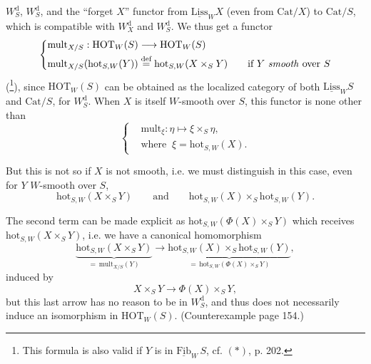 \documentclass[11pt]{article}
\newcommand{\printedpage}[1]{\marginpar{\footnotesize p.~#1}}
\newcommand{\msp}[1]{\marginpar{\footnotesize [#1]}}
\begin{document}
\setcounter{footnote}{97}

\printedpage{124}

$W_S^{\mathrm{d}}$, $W_S^{\mathrm{d}}$, and the ``forget $X$'' functor from $\underline{\mathrm{Liss}}_W X$ (even from $\mathrm{Cat}/X$) to $\mathrm{Cat}/S$, which is compatible with $W_X^{\mathrm{d}}$ and $W_S^{\mathrm{d}}$. We thus get a functor %
\[
\left\{\begin{aligned}
&\mathrm{mult}_{X/S} : \mathrm{HOT}_W(S) \longrightarrow \mathrm{HOT}_W(S)\\
&\mathrm{mult}_{X/S}(\mathrm{hot}_{S,W}(Y)) \overset{\text{def}}{=} \mathrm{hot}_{S,W}(X\times_S Y) \qquad \text{if $Y$ \textit{smooth} over $S$}
\end{aligned}\right.
\]
(\footnote{This formula is also valid if $Y$ is in $\underline{\mathrm{Fib}}_W\, S$, cf. $(*)$, p. 202.}), since $\mathrm{HOT}_W(S)$ can be obtained as the localized category of both $\underline{\mathrm{Liss}}_W S$ and $\mathrm{Cat}/S$, for $W_S^{\mathrm{d}}$. When $X$ is itself $W$-smooth over $S$, this functor is none other than
\[
\left\{\begin{aligned}
&\mathrm{mult}_\xi : \eta \longmapsto \xi\times_S \eta,\\
&\text{where }\ \xi = \mathrm{hot}_{S,W}(X).
\end{aligned}\right.
\]

But this is not so if $X$ is not smooth, i.e. we must distinguish in this case, even for $Y$ $W$-smooth over $S$,
\[
\mathrm{hot}_{S,W}(X\times_S Y) \qquad\text{and}\qquad \mathrm{hot}_{S,W}(X)\times_S \mathrm{hot}_{S,W}(Y).
\]

The second term can be made explicit as $\mathrm{hot}_{S,W}(\Phi(X)\times_S Y)$ which receives $\mathrm{hot}_{S,W}(X\times_S Y)$, i.e.
\msp{page 201}
we have a canonical homomorphism
\[
\underbrace{\mathrm{hot}_{S,W}(X\times_S Y)}_{=\,\mathrm{mult}_{X/S}(Y)} \longrightarrow \underbrace{\mathrm{hot}_{S,W}(X)\times_S \mathrm{hot}_{S,W}(Y)}_{=\,\mathrm{hot}_{S,W}(\Phi(X)\times_S Y)},
\]
induced by
\[
X\times_S Y \longrightarrow \Phi(X)\times_S Y,
\]
but this last arrow has no reason to be in $W_S^{\mathrm{d}}$, and thus does not necessarily induce an isomorphism in $\mathrm{HOT}_W(S)$. (Counterexample page 154.)
\end{document}
